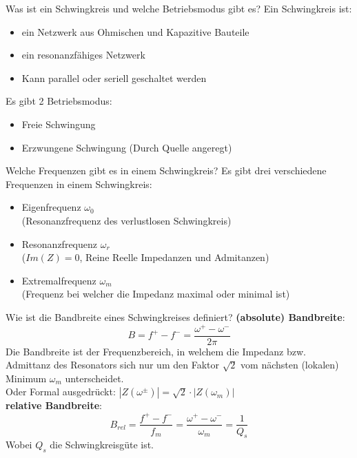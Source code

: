 
\begin{karte}{Was ist ein Schwingkreis und welche Betriebsmodus gibt es?}
	Ein Schwingkreis ist:\\
	\begin{itemize}
		\item ein Netzwerk aus Ohmischen und Kapazitive Bauteile
		\item ein resonanzfähiges Netzwerk
		\item Kann parallel oder seriell geschaltet werden
	\end{itemize}
	Es gibt 2 Betriebsmodus:
	\begin{itemize}
		\item Freie Schwingung 
		\item Erzwungene Schwingung (Durch Quelle angeregt)
	\end{itemize}
\end{karte}

\begin{karte}{Welche Frequenzen gibt es in einem Schwingkreis?}
	Es gibt drei verschiedene Frequenzen in einem Schwingkreis:
	\begin{itemize}
		\item Eigenfrequenz $\omega_0$\\
		(Resonanzfrequenz des verlustlosen Schwingkreis)
		\item Resonanzfrequenz $\omega_r$\\
		($Im(Z) = 0$, Reine Reelle Impedanzen und Admitanzen)
		\item Extremalfrequenz $\omega_m$\\
		(Frequenz bei welcher die Impedanz maximal oder minimal ist)
	\end{itemize}
\end{karte}

\begin{karte}{Wie ist die Bandbreite eines Schwingkreises definiert?}
	\textbf{(absolute) Bandbreite}:
	\begin{equation*}
		B = f^+ - f^- = \dfrac{\omega^+ - \omega^-}{2 \pi}
	\end{equation*}
	Die Bandbreite ist der Frequenzbereich, in welchem die Impedanz bzw. Admittanz des Resonators sich nur um den Faktor $\sqrt{2}$ vom nächsten (lokalen) Minimum $\omega_m$ unterscheidet.\\
	Oder Formal ausgedrückt: \quad $|Z (\omega^{\pm})|=\sqrt{2}\cdot|Z(\omega_{m})|$\\
	\textbf{relative Bandbreite}:
	\begin{equation*}
	B_{rel} = \frac{f^+ - f^-}{f_m} = \frac{\omega^+ - \omega^-}{\omega_m} =\frac{1}{Q_s}
	\end{equation*}
	Wobei $Q_s$ die Schwingkreisgüte ist.
\end{karte}

